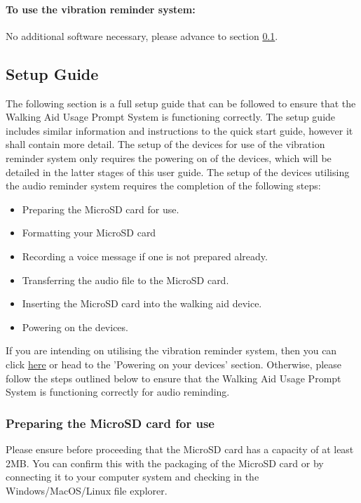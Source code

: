 			\paragraph{To use the vibration reminder system:}\mbox{}

			No additional software necessary, please advance to section \ref{subsec:setup_guide}.

		\subsection{Setup Guide}
		\label{subsec:setup_guide}

			The following section is a full setup guide that can be followed to ensure that the Walking Aid Usage Prompt System is functioning correctly. The setup guide includes similar information and instructions to the quick start guide, however it shall contain more detail. The setup of the devices for use of the vibration reminder system only requires the powering on of the devices, which will be detailed in the latter stages of this user guide. The setup of the devices utilising the audio reminder system requires the completion of the following steps:

			\begin{itemize}
				\item Preparing the MicroSD card for use.
				\item Formatting your MicroSD card
				\item Recording a voice message if one is not prepared already.
				\item Transferring the audio file to the MicroSD card.
				\item Inserting the MicroSD card into the walking aid device.
				\item Powering on the devices.
			\end{itemize}

			If you are intending on utilising the vibration reminder system, then you can click \hyperref[para:powering]{here} or head to the 'Powering on your devices' section. Otherwise, please follow the steps outlined below to ensure that the Walking Aid Usage Prompt System is functioning correctly for audio reminding.

			\subsubsection{Preparing the MicroSD card for use}

				Please ensure before proceeding that the MicroSD card has a capacity of at least 2MB. You can confirm this with the packaging of the MicroSD card or by connecting it to your computer system and checking in the Windows/MacOS/Linux file explorer.

